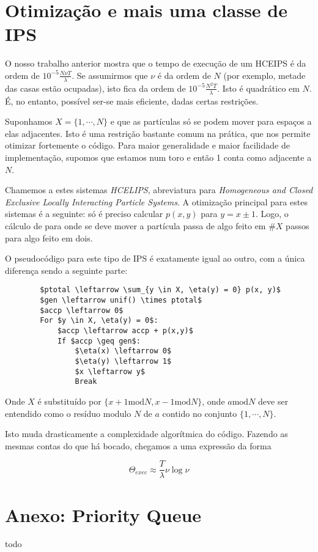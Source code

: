\documentclass{article}
\renewcommand{\mod}{\mathbin{\mathrm{mod}}}
\begin{document}
	\section{Otimização e mais uma classe de IPS}
	
	O nosso trabalho anterior mostra que o tempo de execução de um HCEIPS é da ordem de $10^{-5} \frac{N \nu T}\lambda$. Se assumirmos que $\nu$ é da ordem de $N$ (por exemplo, metade das casas estão ocupadas), isto fica da ordem de $10^{-5} \frac{N^2 T}\lambda$. Isto é quadrático em $N$. É, no entanto, possível ser-se mais eficiente, dadas certas restrições.
	
	Suponhamos $X = \{1,\cdots, N\}$ e que as partículas só se podem mover para espaços a elas adjacentes. Isto é uma restrição bastante comum na prática, que nos permite otimizar fortemente o código. Para maior generalidade e maior facilidade de implementação, supomos que estamos num toro e então 1 conta como adjacente a $N$.
	
	Chamemos a estes sistemas \emph{HCELIPS}, abreviatura para \emph{Homogeneous and Closed Exclusive Locally Interacting Particle Systems}. A otimização principal para estes sistemas é a seguinte: só é preciso calcular $p(x,y)$ para $y = x \pm 1$. Logo, o cálculo de para onde se deve mover a partícula passa de algo feito em $\#X$ passos para algo feito em dois.
	
	O pseudocódigo para este tipo de IPS é exatamente igual ao outro, com a única diferença sendo a seguinte parte:
	
	\begin{lstlisting}
		$ptotal \leftarrow \sum_{y \in X, \eta(y) = 0} p(x, y)$
		$gen \leftarrow unif() \times ptotal$
		$accp \leftarrow 0$
		For $y \in X, \eta(y) = 0$:
			$accp \leftarrow accp + p(x,y)$
			If $accp \geq gen$:
				$\eta(x) \leftarrow 0$
				$\eta(y) \leftarrow 1$
				$x \leftarrow y$
				Break
	\end{lstlisting}
	
	Onde $X$ é substituído por $\{x+1 \mod N, x-1 \mod N\}$, onde $a \mod N$ deve ser entendido como o resíduo modulo $N$ de $a$ contido no conjunto $\{1, \cdots, N\}$.
	
	Isto muda drasticamente a complexidade algorítmica do código. Fazendo as mesmas contas do que há bocado, chegamos a uma expressão da forma
	
	\[\Theta_{exec} \approx \frac T \lambda \nu \log \nu\]
	
	\section{Anexo: Priority Queue}
	
	todo
\end{document}
